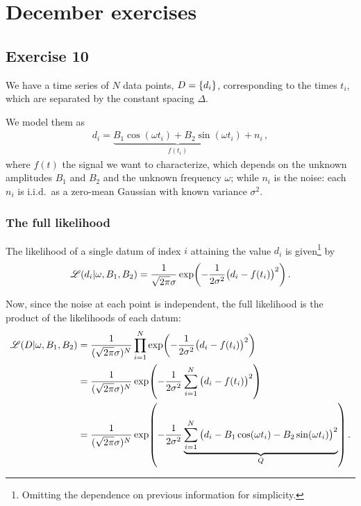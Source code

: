 \documentclass[main.tex]{subfiles}
\begin{document}
\section{December exercises}

\subsection{Exercise 10}

We have a time series of \(N\) data points, \(D = \qty{d_i}\), corresponding to the times \(t_i\), which are separated by the constant spacing \(\Delta \).

We model them as 
%
\begin{align}
d_i = \underbrace{B_1  \cos(\omega t_i) + B_2 \sin(\omega t_i)}_{f(t_i)} + n_i
\,,
\end{align}
%
where \(f(t)\) the signal we want to characterize, which depends on the unknown amplitudes \(B_1 \) and \(B_2 \) and the unknown frequency \(\omega \); while \(n_i \) is the noise: each \(n_i\) is i.i.d.\ as a zero-mean Gaussian with known variance \(\sigma^2\). 

\subsubsection{The full likelihood}

The likelihood of a single datum of index \(i\) attaining the value \(d_i\) is given\footnote{Omitting the dependence on previous information for simplicity.} by 
%
\begin{align}
\mathscr{L} (d_i | \omega , B_1 , B_2 ) = \frac{1}{\sqrt{2 \pi } \sigma }\exp(- \frac{1}{2 \sigma^2}\qty(d_i - f(t_i))^2)
\,.
\end{align}

Now, since the noise at each point is independent, the full likelihood is the product of the likelihoods of each datum: 
%
\begin{align}
\mathscr{L}(D | \omega , B_1 , B_2 ) &= \frac{1}{(\sqrt{2 \pi } \sigma )^{N}} \prod_{i=1}^{N} \exp(- \frac{1}{2 \sigma^2} \qty(d_i - f(t_i))^2)  \\
&= \frac{1}{(\sqrt{2 \pi } \sigma )^{N}}
\exp(- \frac{1}{2 \sigma^2} \sum_{i=1}^{N} \qty(d_i - f(t_i))^2) \\
&= \frac{1}{(\sqrt{2 \pi } \sigma )^{N}}
\exp(- \frac{1}{2 \sigma^2} \underbrace{\sum_{i=1}^{N} \qty(d_i - B_1  \cos(\omega t_i) - B_2 \sin(\omega t_i))^2}_{Q}) 
\,.
\end{align}
\end{document}
